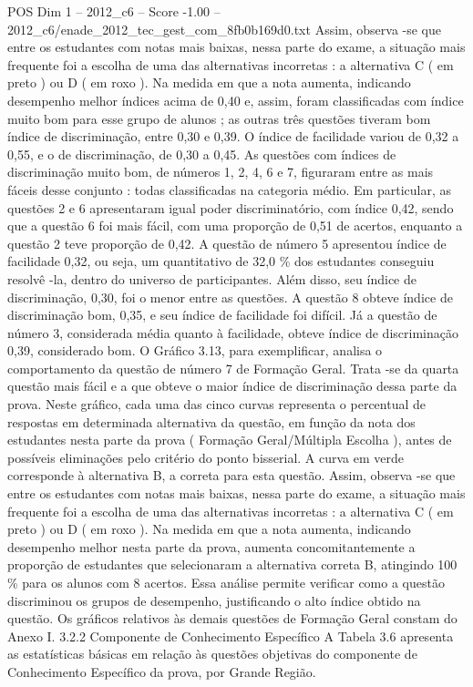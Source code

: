 \begin{textsample}{POS Dim 1 – 2012\_c6 – Score -1.00 – 2012\_c6/enade\_2012\_tec\_gest\_com\_8fb0b169d0.txt}
Assim, observa -se que entre os estudantes com notas mais baixas, nessa parte do exame, a situação mais frequente foi a escolha de uma das alternativas incorretas : a alternativa C ( em preto ) ou D ( em roxo ).
Na medida em que a nota aumenta, indicando desempenho melhor índices acima de 0,40 e, assim, foram classificadas com índice muito bom para esse grupo de alunos ; as outras três questões tiveram bom índice de discriminação, entre 0,30 e 0,39.
O índice de facilidade variou de 0,32 a 0,55, e o de discriminação, de 0,30 a 0,45.
As questões com índices de discriminação muito bom, de números 1, 2, 4, 6 e 7, figuraram entre as mais fáceis desse conjunto : todas classificadas na categoria médio.
Em particular, as questões 2 e 6 apresentaram igual poder discriminatório, com índice 0,42, sendo que a questão 6 foi mais fácil, com uma proporção de 0,51 de acertos, enquanto a questão 2 teve proporção de 0,42.
A questão de número 5 apresentou índice de facilidade 0,32, ou seja, um quantitativo de 32,0 \% dos estudantes conseguiu resolvê -la, dentro do universo de participantes.
Além disso, seu índice de discriminação, 0,30, foi o menor entre as questões.
A questão 8 obteve índice de discriminação bom, 0,35, e seu índice de facilidade foi difícil.
Já a questão de número 3, considerada média quanto à facilidade, obteve índice de discriminação 0,39, considerado bom.
O Gráfico 3.13, para exemplificar, analisa o comportamento da questão de número 7 de Formação Geral.
Trata -se da quarta questão mais fácil e a que obteve o maior índice de discriminação dessa parte da prova.
Neste gráfico, cada uma das cinco curvas representa o percentual de respostas em determinada alternativa da questão, em função da nota dos estudantes nesta parte da prova ( Formação Geral/Múltipla Escolha ), antes de possíveis eliminações pelo critério do ponto bisserial.
A curva em verde corresponde à alternativa B, a correta para esta questão.
Assim, observa -se que entre os estudantes com notas mais baixas, nessa parte do exame, a situação mais frequente foi a escolha de uma das alternativas incorretas : a alternativa C ( em preto ) ou D ( em roxo ).
Na medida em que a nota aumenta, indicando desempenho melhor nesta parte da prova, aumenta concomitantemente a proporção de estudantes que selecionaram a alternativa correta B, atingindo 100 \% para os alunos com 8 acertos.
Essa análise permite verificar como a questão discriminou os grupos de desempenho, justificando o alto índice obtido na questão.
Os gráficos relativos às demais questões de Formação Geral constam do Anexo I. 3.2.2 Componente de Conhecimento Específico A Tabela 3.6 apresenta as estatísticas básicas em relação às questões objetivas do componente de Conhecimento Específico da prova, por Grande Região.

\end{textsample}
